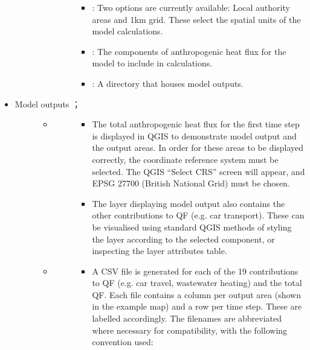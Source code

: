 \documentclass[letterpaper,10pt,english]{sphinxmanual}
\begin{document}
\begin{itemize}
\begin{description}
\begin{itemize}
\begin{description}
\begin{itemize}
\item {} 
: Two options are currently available: Local authority areas and 1km grid. These select the spatial units of the model calculations.

\item {} 
: The components of anthropogenic heat flux for the model to include in calculations.

\item {} 
: A directory that houses model outputs.

\end{itemize}

\end{description}

\end{itemize}

\end{description}

\item {} \begin{description}
\item[{Model outputs ；}] \leavevmode\begin{itemize}
\item {} \begin{description}
\item[{}] \leavevmode\begin{itemize}
\item {} 
The total anthropogenic heat flux for the first time step is displayed in QGIS to demonstrate model output and the output areas. In order for these areas to be displayed correctly, the coordinate reference system must be selected. The QGIS “Select CRS” screen will appear, and EPSG 27700 (British National Grid) must be chosen.

\item {} 
The layer displaying model output also contains the other contributions to QF (e.g. car transport). These can be visualised using standard QGIS methods of styling the layer according to the selected component, or inspecting the layer attributes table.

\end{itemize}

\end{description}

\item {} \begin{description}
\item[{}] \leavevmode\begin{itemize}
\item {} 
A CSV file is generated for each of the 19 contributions to QF (e.g. car travel, wastewater heating) and the total QF. Each file contains a column per output area (shown in the example map) and a row per time step. These are labelled accordingly. The filenames are abbreviated where necessary for compatibility, with the following convention used:


\end{itemize}
\end{description}
\end{itemize}
\end{description}
\end{itemize}
\end{document}
